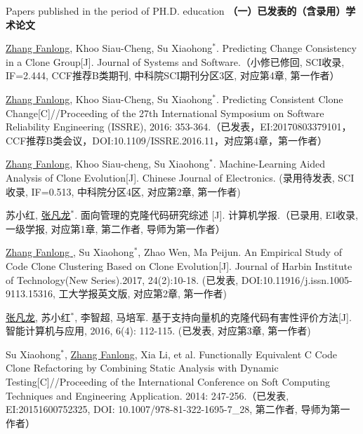
 {Papers
published in the period of PH.D. education}
\noindent\textbf{（一）已发表的（含录用）学术论文}
\begin{publist}

\item
\underline{Zhang Fanlong}, Khoo Siau-Cheng, Su Xiaohong{$^*$}. Predicting Change Consistency in a Clone Group[J]. Journal of Systems and Software.（小修已修回, SCI收录, IF=2.444, CCF推荐B类期刊, 中科院SCI期刊分区3区, 对应第4章, 第一作者）

\item
\underline{Zhang Fanlong}, Khoo Siau-Cheng, Su Xiaohong{$^*$}. Predicting Consistent Clone Change[C]//Proceeding of the 27th International Symposium on Software Reliability Engineering (ISSRE), 2016: 353-364.（已发表，EI:20170803379101，CCF推荐B类会议，DOI:10.1109/ISSRE.2016.11，对应第4章，第一作者）
\item
\underline{Zhang Fanlong}, Khoo Siau-cheng, Su Xiaohong{$^*$}. Machine-Learning Aided Analysis of Clone Evolution[J]. Chinese Journal of Electronics. (录用待发表, SCI收录, IF=0.513, 中科院分区4区, 对应第2章, 第一作者)

\item 
苏小红, \underline{张凡龙}{$^*$}. 面向管理的克隆代码研究综述 [J]. 计算机学报.（已录用, EI收录, 一级学报, 对应第1章, 第二作者, 导师为第一作者）

\item
\underline{Zhang Fanlong }, Su Xiaohong{$^*$},  Zhao Wen,  Ma Peijun. An Empirical Study of Code Clone Clustering Based on Clone Evolution[J]. Journal of Harbin Institute of Technology(New Series).2017, 24(2):10-18. (已发表, DOI:10.11916/j.issn.1005-9113.15316, 工大学报英文版, 对应第2章, 第一作者)

\item
\underline{张凡龙}, 苏小红{$^*$},  李智超,  马培军. 基于支持向量机的克隆代码有害性评价方法[J]. 智能计算机与应用, 2016, 6(4): 112-115. (已发表, 对应第3章, 第一作者)

\item
Su Xiaohong{$^*$}, \underline{Zhang Fanlong},  Xia Li, et al. Functionally Equivalent C Code Clone Refactoring by Combining Static Analysis with Dynamic Testing[C]//Proceeding of the International Conference on Soft Computing Techniques and Engineering Application. 2014: 247-256.（已发表, EI:20151600752325, DOI: 10.1007/978-81-322-1695-7\_28, 第二作者, 导师为第一作者）
\end{publist}

